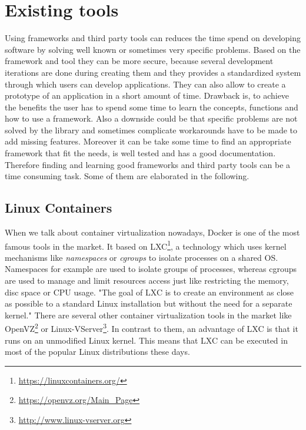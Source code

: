 \section{Existing tools}

Using frameworks and third party tools can reduces the time spend on developing software by solving well known or sometimes very specific problems.
Based on the framework and tool they can be more secure, because several development iterations are done during creating them and they provides a standardized system through which users can develop applications.
They can also allow to create a prototype of an application in a short amount of time.
Drawback is, to achieve the benefits the user has to spend some time to learn the concepts, functions and how to use a framework.
Also a downside could be that specific problems are not solved by the library and sometimes complicate workarounds have to be made to add missing features.
Moreover it can be take some time to find an appropriate framework that fit the needs, is well tested and has a good documentation.
Therefore finding and learning good frameworks and third party tools can be a time consuming task.
Some of them are elaborated in the following.

\subsection{Linux Containers}
When we talk about container virtualization nowadays, Docker is one of the most famous tools in the market.
It based on \ac{LXC}\footnote{\url{https://linuxcontainers.org/}}, a technology which uses kernel mechanisms like \textit{namespaces} or \textit{cgroups} to isolate processes on a shared \ac{OS}.\autocite[cf.][p. 381]{Pahl:2015}
Namespaces for example are used to isolate groups of processes, whereas cgroups are used to manage and limit resources access just like restricting the memory, disc space or \ac{CPU} usage.\autocite[cf.][p. 381]{Pahl:2015}
"The goal of \ac{LXC} is to create an environment as close as possible to a standard Linux installation but without the need for a separate kernel."\autocite[p. 72]{Tosatto:2015}
There are several other container virtualization tools in the market like OpenVZ\footnote{\url{https://openvz.org/Main_Page}} or Linux-VServer\footnote{\url{http://www.linux-vserver.org}}.
In contrast to them, an advantage of \ac{LXC} is that it runs on an unmodified Linux kernel.
This means that \ac{LXC} can be executed in most of the popular Linux distributions these days.

